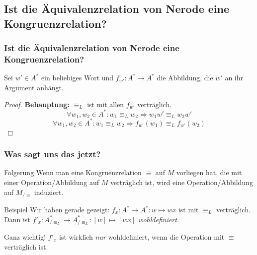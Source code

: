 \subsection{Ist die Äquivalenzrelation von Nerode eine Kongruenzrelation?}
\begin{frame}
	\frametitle{Ist die Äquivalenzrelation von Nerode eine Kongruenzrelation?}
	Sei \emph{$w'\in A^*$} ein beliebiges Wort und \emph{$f_{w'}:A^*\to A^*$} die Abbildung, die $w'$ an ihr Argument anhängt.\\	
	\begin{proof}
		\textbf{Behauptung:} $\equiv_L$ ist mit allen $f_{w'}$ verträglich.
		$$\forall w_1, w_2\in A^*:w_1\equiv_L w_2 \Rightarrow w_1w'\equiv_L w_2w'$$
		$$\forall w_1, w_2\in A^*:w_1\equiv_L w_2 \Rightarrow f_{w'}(w_1) \equiv_L f_{w'}(w_2)$$
	\end{proof}
\end{frame}
\begin{frame}
	\frametitle{Was sagt uns das jetzt?}
	\begin{block}{Folgerung}
		Wenn man eine Kongruenzrelation $\equiv$ auf $M$ vorliegen hat, die mit einer Operation/Abbildung auf $M$ verträglich ist, wird eine Operation/Abbildung auf $M_{/\equiv}$ induziert.
	\end{block}
	\pause
	\begin{exampleblock}{Beispiel}
		Wir haben gerade gezeigt: $f_x:A^*\to A^*:w\mapsto wx$ ist mit $\equiv_L$ verträglich.\\
		\pause
		Dann ist ${f'}_x:A^*_{/\equiv_L}\to A^*_{/\equiv_L}:[w]\mapsto[wx]$ \emph{wohldefiniert}.
	\end{exampleblock}
	\pause
	\begin{alertblock}{Ganz wichtig!}
		${f'}_x$ ist wirklich \emph{nur} wohldefiniert, wenn die Operation mit $\equiv$ verträglich ist.
	\end{alertblock}
	
\end{frame}
